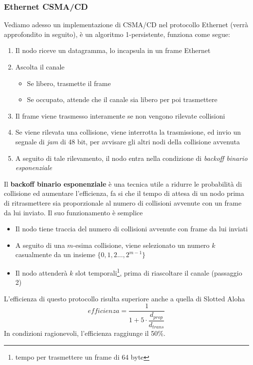 \documentclass[12pt, letterpaper]{article}
\begin{document}
\subsubsection{Ethernet CSMA/CD}
Vediamo adesso un implementazione di CSMA/CD nel protocollo Ethernet (verrà approfondito in seguito), è un 
algoritmo 1-persistente, funziona come segue:\begin{enumerate}
    \item Il nodo riceve un datagramma, lo incapsula in un frame Ethernet 
    \item Ascolta il canale\begin{itemize}
        \item Se libero, trasmette il frame 
        \item Se occupato, attende che il canale sia libero per poi trasmettere 
    \end{itemize}
    \item Il frame viene trasmesso interamente se non vengono rilevate collisioni 
    \item Se viene rilevata una collisione, viene interrotta la trasmissione, ed invio un 
    segnale di \textit{jam} di 48 bit, per avvisare gli altri nodi della collisione avvenuta 
    \item A seguito di tale rilevamento, il nodo entra nella condizione di \textit{backoff binario esponenziale}
\end{enumerate}
Il  \textbf{backoff binario esponenziale} è una tecnica utile a ridurre le probabilità di collisione ed aumentare 
l'efficienza, fa si che il tempo di attesa di un nodo prima di ritrasmettere sia proporzionale al numero di collisioni 
avvenute con un frame da lui inviato. Il suo funzionamento è semplice\begin{itemize}
    \item Il nodo tiene traccia del numero di collisioni avvenute con frame da lui inviati
    \item A seguito di una $m$-esima collisione, viene selezionato un numero $k$ casualmente da un insieme $\{0,1,2\dots,2^{m-1}\}$
    \item Il nodo attenderà $k$ slot temporali\footnote{tempo per trasmettere un frame di 64 byte}, prima
    di riascoltare il canale (passaggio 2)
\end{itemize}
L'efficienza di questo protocollo risulta superiore anche a quella di Slotted Aloha 
$$efficienza = \dfrac{1}{1+5\cdot\dfrac{d_{prop}}{d_{trans}}} $$
In condizioni ragionevoli, l'efficienza raggiunge il 50\%. 
\end{document}
